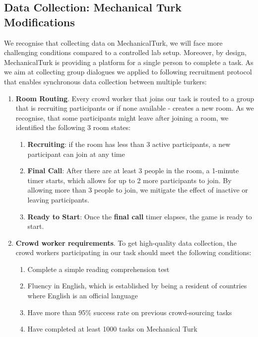 \documentclass[acmsmall,manuscript,screen]{acmart}
\begin{document}
\subsection{Data Collection: Mechanical Turk Modifications}
\label{app:mturk}
We recognise that collecting data on MechanicalTurk, we will face more challenging conditions compared to a controlled lab setup. Moreover, by design, MechanicalTurk is providing a platform for a single person to complete a task. As we aim at collecting group dialogues we applied to following recruitment protocol that enables synchronous data collection between multiple turkers: 

\begin{enumerate}
\item \textbf{Room Routing}.
Every crowd worker that joins our task is routed to a group that is recruiting participants or if none available - creates a new room. As we recognise, that some participants might leave after joining a room, we identified the following 3 room states: 
\begin{enumerate}
\item \textbf{Recruiting}: if the room has less than 3 active participants, a new participant can join at any time
\item \textbf{Final Call}: After there are at least 3 people in the room, a 1-minute timer starts, which allows for up to 2 more participants to join. By allowing more than 3 people to join, we mitigate the effect of inactive or leaving participants.
\item \textbf{Ready to Start}: Once the \textbf{final call} timer elapses, the game is ready to start.  
\end{enumerate}


\item \textbf{Crowd worker requirements}. 
To get high-quality data collection, the crowd workers participating in our task should meet the following conditions:
\begin{enumerate}
    \item Complete a simple reading comprehension test
    \item Fluency in English, which is established by being a resident of countries where English is an official language
    \item Have more than 95\% success rate on previous crowd-sourcing tasks
    \item Have completed at least 1000 tasks on Mechanical Turk
\end{enumerate}


\end{enumerate}
\end{document}
